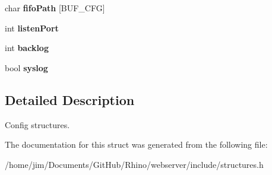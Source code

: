 \begin{DoxyCompactItemize}
\item 
\hypertarget{structconfiguration_ae245a0b0809a1d03125b14d6250e08ae}{}char {\bfseries fifo\+Path} \mbox{[}B\+U\+F\+\_\+\+C\+F\+G\mbox{]}\label{structconfiguration_ae245a0b0809a1d03125b14d6250e08ae}

\item 
\hypertarget{structconfiguration_aec617799bec821de03c3ba39120d53a4}{}int {\bfseries listen\+Port}\label{structconfiguration_aec617799bec821de03c3ba39120d53a4}

\item 
\hypertarget{structconfiguration_a393c7b28ae51b4d4388b7f815467cc68}{}int {\bfseries backlog}\label{structconfiguration_a393c7b28ae51b4d4388b7f815467cc68}

\item 
\hypertarget{structconfiguration_a0b6a3a095413154418f46056d13dad70}{}bool {\bfseries syslog}\label{structconfiguration_a0b6a3a095413154418f46056d13dad70}

\end{DoxyCompactItemize}


\subsection{Detailed Description}
Config structures. 

The documentation for this struct was generated from the following file\+:\begin{DoxyCompactItemize}
\item 
/home/jim/\+Documents/\+Git\+Hub/\+Rhino/webserver/include/structures.\+h\end{DoxyCompactItemize}
